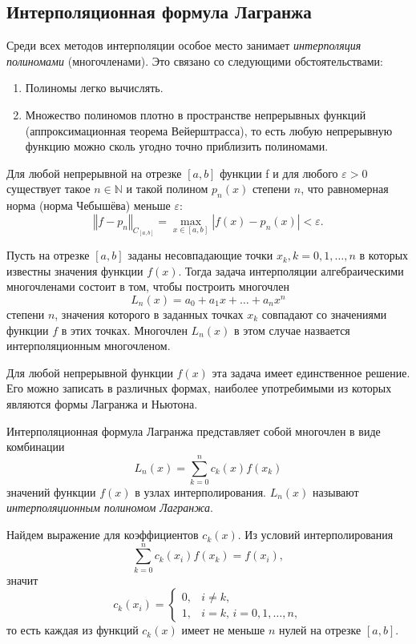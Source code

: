 \subsection{Интерполяционная формула Лагранжа}

Среди всех методов интерполяции особое место занимает
\emph{интерполяция полиномами} (многочленами). Это связано со
следующими обстоятельствами:
\begin{enumerate}
\item Полиномы легко вычислять.
\item Множество полиномов плотно в пространстве непрерывных функций
  (аппроксимационная теорема Вейерштрасса), то есть любую непрерывную
  функцию можно сколь угодно точно приблизить
  полиномами.
\end{enumerate}

\begin{thm}
  Для любой непрерывной на отрезке $[a,b]$ функции f и для любого
  $\varepsilon>0$ существует такое $n\in\mathbb{N}$ и такой полином
  $p_{n}(x)$ степени $n$, что равномерная норма (норма Чебышёва)
  меньше $\varepsilon$:
\[
\left\Vert f-p_{n}\right\Vert
_{C_{[a,b]}}=\max_{x\in[a,b]}|f(x)-p_{n}(x)|<\varepsilon.
\]

\end{thm}
Пусть на отрезке $[a,b]$ заданы несовпадающие точки
$x_{k},k=0,1,\dots,n$ в которых известны значения функции
$f(x)$. Тогда задача интерполяции алгебраическими многочленами состоит
в том, чтобы построить многочлен
\[
L_{n}(x)=a_{0}+a_{1}x+\dots+a_{n}x^{n}
\]
степени $n$, значения которого в заданных точках $x_{k}$ совпадают со
значениями функции $f$ в этих точках. Многочлен $L_{n}(x)$ в этом
случае назвается интерполяционным многочленом.

Для любой непрерывной функции $f(x)$ эта задача имеет единственное
решение. Его можно записать в различных формах, наиболее употребимыми
из которых являются формы Лагранжа и Ньютона.

Интерполяционная формула Лагранжа представляет собой многочлен в виде
комбинации
\[
L_{n}(x)=\sum_{k=0}^{n}c_{k}(x)f(x_{k})
\]
значений функции $f(x)$ в узлах интерполирования. $L_{n}(x)$ называют
\emph{интерполяционным полиномом Лагранжа}.

Найдем выражение для коэффициентов $c_{k}(x)$. Из условий
интерполирования
\[
\sum_{k=0}^{n}c_{k}(x_{i})f(x_{k})=f(x_{i}),
\]
значит
\[
c_{k}(x_{i})=\begin{cases} 0, & i\neq k,\\ 1, & i=k,\, i=0,1,\dots,n,
\end{cases}
\]
то есть каждая из функций $c_{k}(x)$ имеет не меньше $n$ нулей на
отрезке $[a,b]$.

